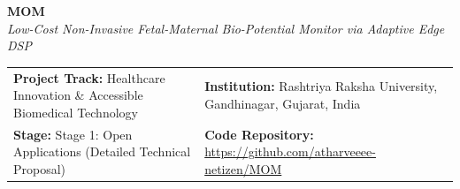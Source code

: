 \documentclass[10pt,a4paper]{article}
\begin{document}
\begin{center}
    {\huge\textbf{MOM}}\\[0.2em]
    {\large\textit{Low-Cost Non-Invasive Fetal-Maternal Bio-Potential Monitor via Adaptive Edge DSP}}\\[0.6em]
\end{center}

\noindent
\begin{tabularx}{\textwidth}{|X|X|}
\hline
\textbf{Project Track:} Healthcare Innovation \& Accessible Biomedical Technology & \textbf{Institution:} Rashtriya Raksha University, Gandhinagar, Gujarat, India \\
\textbf{Stage:} Stage 1: Open Applications (Detailed Technical Proposal) & \textbf{Code Repository:} \href{https://github.com/atharveeee-netizen/MOM}{https://github.com/atharveeee-netizen/MOM} \\
\hline
\end{tabularx}

\vspace{0.4em}
\end{document}
